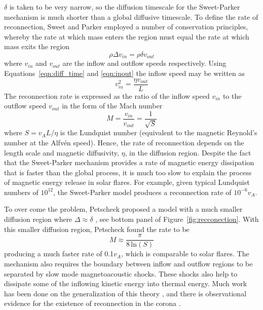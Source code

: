 $\delta$ is taken to be very narrow, so the diffusion timescale for the Sweet-Parker mechanism is much shorter than a global diffusive timescale. To define the rate of reconnection, Sweet and Parker employed a number of conservation principles, whereby the rate at which mass enters the region must equal the rate at which mass exits the region
\begin{equation}
\rho \Delta v_{in} = \rho \delta v_{out}
\label{eqn:inout}
\end{equation}
where $v_{in}$ and $v_{out}$ are the inflow and outflow speeds respectively. Using Equations~\ref{eqn:diff_time} and \ref{eqn:inout} the inflow speed may be written as
\begin{equation}
v_{in}^2 = \frac{\eta v_{out}}{L}
\end{equation}
The reconnection rate is expressed as the ratio of the inflow speed $v_{in}$ to the outflow speed $v_{out}$ in the form of the Mach number
\begin{equation}
M = \frac{v_{in}}{v_{out}} = \frac{1}{\sqrt{S}}
\end{equation}
where $S=v_AL/\eta$ is the Lundquist number (equivalent to the magnetic Reynold's number at the Alfv\'{e}n speed). Hence, the rate of reconnection depends on the length scale and magnetic diffusivity, $\eta$, in the diffusion region. Despite the fact that the Sweet-Parker mechanism provides a rate of magnetic energy dissipation that is faster than the global process, it is much too slow to explain the process of magnetic energy release in solar flares. For example, given typical Lundquist numbers of $10^{12}$, the Sweet-Parker model produces a reconnection rate of $10^{-6}v_A$.

To over come the problem, Petscheck proposed a model with a much smaller diffusion region where $\Delta\approx\delta$ \citep{petschek1964}, see bottom panel of Figure~\ref{fig:recconection}. With this smaller diffusion region, Petscheck found the rate to be 
\begin{equation}
M \approx \frac{\pi}{8\,\mathrm{ln}(S)}
\end{equation}
producing a much faster rate of 0.1$v_A$, which is comparable to solar flares. The mechanism also requires the boundary between inflow and outflow regions to be separated by slow mode magnetoacoustic shocks. These shocks also help to dissipate some of the inflowing kinetic energy into thermal energy. Much work has been done on the generalization of this theory \citep{priest1986, sonnerup1970}, and there is observational evidence for the existence of reconnection in the corona \citep{su2013}.

